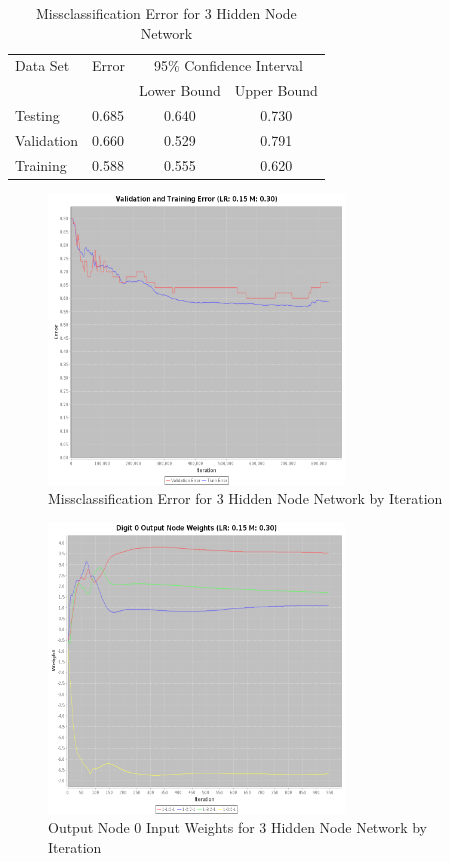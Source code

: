 \documentclass{article}
\begin{document}
\begin{table}
\caption{Missclassification Error for 3 Hidden Node Network}
\begin{center}
\begin{tabular}{llcc}
\toprule
Data Set & Error & \multicolumn{2}{c}{95\% Confidence Interval} \\
\cmidrule(r){3-4}
& & Lower Bound & Upper Bound \\
\midrule
Testing       & 0.685 &  0.640 & 0.730  \\
Validation    & 0.660 &  0.529 & 0.791  \\
Training      & 0.588 &  0.555 & 0.620  \\
\bottomrule
\end{tabular}
\label{table3}
\end{center}
\end{table}

\begin{figure}
\centering
\includegraphics[width=0.7\textwidth]{data/final/3_hidden_node_error.png}
\caption{Missclassification Error for 3 Hidden Node Network by Iteration}
\label{error3}
\end{figure}

\begin{figure}
\centering
\includegraphics[width=0.7\textwidth]{data/final/3_hidden_node_0weight.png}
\caption{Output Node 0 Input Weights for 3 Hidden Node Network by Iteration}
\label{weight3}
\end{figure}
\end{document}
